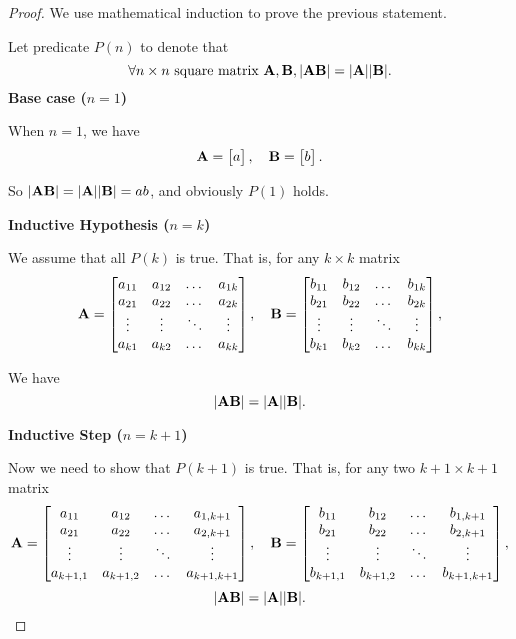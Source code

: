\documentclass[12pt,a4paper]{article}
\begin{document}
\begin{proof}
We use mathematical induction to prove the previous statement.

Let predicate $P(n)$ to denote that
$$\forall n \times n \text{ square matrix } \mathbf{A}, \mathbf{B}, |\mathbf{A}\mathbf{B}| = |\mathbf{A}||\mathbf{B}|.$$ 
\textbf{Base case ($n = 1$)}

When $n = 1$, we have
\[
\mathbf{A} = \begin{bmatrix} a \end{bmatrix}, \quad \mathbf{B} = \begin{bmatrix} b \end{bmatrix}.
\]

So $|\mathbf{A}\mathbf{B}| = |\mathbf{A}||\mathbf{B}| = ab$, and obviously $P(1)$ holds.

\textbf{Inductive Hypothesis ($n = k$)}

We assume that all $P(k)$ is true. That is, for any $k\times k$ matrix
\[
\mathbf{A} = \begin{bmatrix}
a_{11} & a_{12} & \dots  & a_{1k} \\
a_{21} & a_{22} & \dots  & a_{2k} \\
\vdots & \vdots & \ddots & \vdots \\
a_{k1} & a_{k2} & \dots  & a_{kk}
\end{bmatrix}, \quad
\mathbf{B} = \begin{bmatrix}
b_{11} & b_{12} & \dots  & b_{1k} \\
b_{21} & b_{22} & \dots  & b_{2k} \\
\vdots & \vdots & \ddots & \vdots \\
b_{k1} & b_{k2} & \dots  & b_{kk}
\end{bmatrix},
\]

We have
$$|\mathbf{A}\mathbf{B}| = |\mathbf{A}||\mathbf{B}|.$$


\textbf{Inductive Step ($n = k + 1$)}

Now we need to show that $P(k+1)$ is true. That is, for any two $k+1\times k+1$ matrix
\[
\mathbf{A} = \begin{bmatrix}
a_{11} & a_{12} & \dots  & a_{1,k+1} \\
a_{21} & a_{22} & \dots  & a_{2,k+1} \\
\vdots & \vdots & \ddots & \vdots \\
a_{k+1,1} & a_{k+1,2} & \dots  & a_{k+1,k+1}
\end{bmatrix}, \quad
\mathbf{B} = \begin{bmatrix}
b_{11} & b_{12} & \dots  & b_{1,k+1} \\
b_{21} & b_{22} & \dots  & b_{2,k+1} \\
\vdots & \vdots & \ddots & \vdots \\
b_{k+1,1} & b_{k+1,2} & \dots  & b_{k+1,k+1}
\end{bmatrix},
\]
$$|\mathbf{A}\mathbf{B}| = |\mathbf{A}||\mathbf{B}|.$$


\end{proof}
\end{document}
